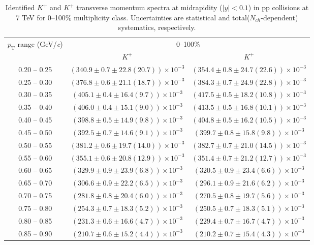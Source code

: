 \clearpage
\begin{table}
\caption{Identified $K^{+}$ and $K^{+}$  transverse momentum spectra at midrapidity ($|y|<0.1$) in pp collisions at 7 TeV for 0--100\% multiplicity class. Uncertainties are statistical and total($N_{ch}$-dependent) systematics, respectively.}
\label{tab:KaonPlus_KaonMinus_0to100}
\begin{center}
\begin{tabular}{ c | c c }
\hline
\multirow{2}{*}{$p_{\mathrm{T}}$ range (GeV/\textit{c})} & \multicolumn{2}{c}{0--100\%} \\ & $K^{+}$& $K^{+}$\\ 
\hline
0.20 -- 0.25 & $(340.9\pm0.7\pm22.8(20.7))\times10^{-3}$ & $(354.4\pm0.8\pm24.7(22.6))\times10^{-3}$ \\ 
0.25 -- 0.30 & $(376.8\pm0.6\pm21.1(18.7))\times10^{-3}$ & $(384.3\pm0.7\pm24.9(22.8))\times10^{-3}$ \\ 
0.30 -- 0.35 & $(405.1\pm0.4\pm16.4(9.7))\times10^{-3}$ & $(417.5\pm0.5\pm18.2(10.8))\times10^{-3}$ \\ 
0.35 -- 0.40 & $(406.0\pm0.4\pm15.1(9.0))\times10^{-3}$ & $(413.5\pm0.5\pm16.8(10.1))\times10^{-3}$ \\ 
0.40 -- 0.45 & $(398.8\pm0.5\pm14.9(9.8))\times10^{-3}$ & $(404.8\pm0.5\pm16.2(10.5))\times10^{-3}$ \\ 
0.45 -- 0.50 & $(392.5\pm0.7\pm14.6(9.1))\times10^{-3}$ & $(399.7\pm0.8\pm15.8(9.8))\times10^{-3}$ \\ 
0.50 -- 0.55 & $(381.2\pm0.6\pm19.7(14.0))\times10^{-3}$ & $(382.7\pm0.7\pm21.0(14.5))\times10^{-3}$ \\ 
0.55 -- 0.60 & $(355.1\pm0.6\pm20.8(12.9))\times10^{-3}$ & $(351.4\pm0.7\pm21.2(12.7))\times10^{-3}$ \\ 
0.60 -- 0.65 & $(329.9\pm0.9\pm23.9(6.8))\times10^{-3}$ & $(320.5\pm0.9\pm23.4(6.6))\times10^{-3}$ \\ 
0.65 -- 0.70 & $(306.6\pm0.9\pm22.2(6.5))\times10^{-3}$ & $(296.1\pm0.9\pm21.6(6.2))\times10^{-3}$ \\ 
0.70 -- 0.75 & $(281.8\pm0.8\pm20.4(6.0))\times10^{-3}$ & $(270.5\pm0.8\pm19.7(5.6))\times10^{-3}$ \\ 
0.75 -- 0.80 & $(254.3\pm0.7\pm18.3(5.2))\times10^{-3}$ & $(250.5\pm0.7\pm18.3(5.1))\times10^{-3}$ \\ 
0.80 -- 0.85 & $(231.3\pm0.6\pm16.6(4.7))\times10^{-3}$ & $(229.4\pm0.7\pm16.7(4.7))\times10^{-3}$ \\ 
0.85 -- 0.90 & $(210.7\pm0.6\pm15.2(4.4))\times10^{-3}$ & $(210.2\pm0.7\pm15.4(4.3))\times10^{-3}$ \\ 

\end{tabular}
\end{center}
\end{table}
